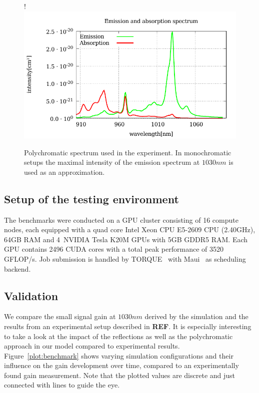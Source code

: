 \begin{figure}[H]
  \centerline{
     {!} {\includegraphics{plot/sigma.pdf}}
  }
  \caption{Polychromatic spectrum used in the experiment. In monochromatic setups
  the maximal intensity of the emission spectrum at $1030nm$ is used as an
  approximation.}
\label{plot:polychromatic_spectrum}
\end{figure}

\subsection{Setup of the testing environment}
\label{subsec:testingEnvironment}
The benchmarks were conducted on a GPU cluster consisting of 16 compute nodes,
each equipped with a quad core Intel Xeon CPU E5-2609 CPU (2.40GHz), 64GB RAM
and 4~NVIDIA Tesla K20M GPUs with 5GB GDDR5 RAM\@. Each GPU contains 2496 CUDA cores with a total
peak performance of 3520 GFLOP/s. Job submission is handled by TORQUE~\cite{torque} 
with Maui~\cite{maui} as scheduling backend. 


\subsection{Validation}
\label{subsec:validation}
We compare the small signal gain at $1030 nm$
derived by the simulation and the results from an experimental setup described
in \textbf{REF}. 
It is especially interesting to take a look at the impact of the reflections as well as the polychromatic
approach in our model compared to experimental results. Figure~\ref{plot:benchmark} shows
varying simulation configurations and their influence on the
gain development over time, compared to an experimentally found gain measurement.
Note that the plotted values are discrete and just connected with lines to guide the eye.

